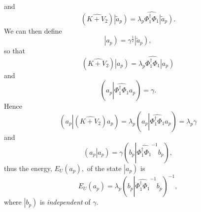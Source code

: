 \documentclass[aps,preprint]{revtex4}%
\begin{document}
and
\begin{equation}
\left(  \widehat{K+V_{2}}\right)  \left\vert \overset{}{\tilde{a}_{p}}\right)
=\lambda_{p}\widehat{\Phi_{1}^{\dagger}\Phi_{1}}\left\vert \overset{}{\tilde
{a}_{p}}\right)  .
\end{equation}
We can then define
\begin{equation}
\left\vert \overset{}{a_{p}}\right)  =\gamma^{\frac{1}{2}}\left\vert
\overset{}{\tilde{a}_{p}}\right)  ,
\end{equation}
so that
\begin{equation}
\left(  \widehat{K+V_{2}}\right)  \left\vert \overset{}{a_{p}}\right)
=\lambda_{p}\widehat{\Phi_{1}^{\dagger}\Phi_{1}}\left\vert \overset{}{a_{p}%
}\right)
\end{equation}
and
\begin{equation}
\left(  a_{p}\left\vert \widehat{\Phi_{1}^{\dagger}\Phi_{1}}a_{p}\right.
\right)  =\gamma.
\end{equation}
Hence
\begin{equation}
\left(  \overset{}{a_{p}}\left\vert \left(  \widehat{K+V_{2}}\right)  \right.
\overset{}{a_{p}}\right)  =\lambda_{p}\left(  \overset{}{a_{p}}\left\vert
\widehat{\Phi_{1}^{\dagger}\Phi_{1}}\right.  \overset{}{a_{p}}\right)
=\lambda_{p}\gamma
\end{equation}
and
\begin{equation}
\left(  \overset{}{a_{p}}\left\vert \overset{}{a_{p}}\right.  \right)
=\gamma\left(  \overset{}{b_{p}}\left\vert \widehat{\Phi_{1}^{\dagger}\Phi
_{1}}^{-1}\overset{}{b_{p}}\right.  \right)  ,
\end{equation}
thus the energy, $E_{U}\left(  a_{p}\right)  ,$ of the state $\left\vert
\overset{}{a_{p}}\right)  $ is
\begin{equation}
E_{U}\left(  a_{p}\right)  =\lambda_{p}\left(  \overset{}{b_{p}}\left\vert
\widehat{\Phi_{1}^{\dagger}\Phi_{1}}^{-1}\overset{}{b_{p}}\right.  \right)
^{-1},
\end{equation}
where $\left\vert b_{p}\right)  $ is \emph{independent }of $\gamma$.
\end{document}
